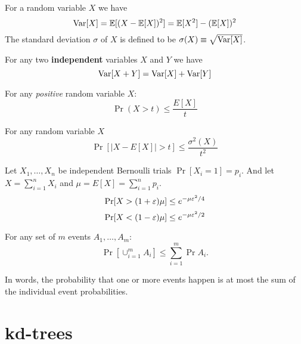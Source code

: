\documentclass{article}
\begin{document}
\begin{definition}[Variance]%
For a random variable $X$ we have 
\begin{equation}
{\operatorname{Var}}[X] = {\mathbb E}[(X - {\mathbb E}[X])^2] = {\mathbb E}[X^2] - ({\mathbb E}[X])^2
\end{equation}
The standard deviation $\sigma$ of $X$ is defined to be $\sigma(X) \equiv \sqrt{{\operatorname{Var}}[X]}$.
\end{definition}

\begin{definition}%
For any two {\bf independent} variables $X$ and $Y$ we have 
\begin{equation}
{\operatorname{Var}}[X + Y] = {\operatorname{Var}}[X] + {\operatorname{Var}}[Y]
\end{equation}
\end{definition}

\begin{fact}%
For any {\it positive} random variable $X$:
\begin{equation}
\Pr(X > t) \le \frac{E[X]}{t}
\end{equation}
\end{fact}

\begin{fact}%
For any random variable $X$
\begin{equation}
\Pr[|X-E[X]| > t] \le \frac{\sigma^2(X)}{t^2}
\end{equation}
\end{fact}


\begin{lemma}
Let $X_1,\ldots,X_n$ be independent Bernoulli trials $\Pr[X_i=1] = p_i$. 
And let $X = \sum_{i=1}^{n}X_i$ and $\mu = E[X] = \sum_{i=1}^{n}p_i$.
\begin{equation}
\Pr[X > (1 + \varepsilon)\mu] \le e^{-\mu \varepsilon^2/4}
\end{equation} 
\begin{equation}
\Pr[X < (1 - \varepsilon)\mu] \le e^{-\mu \varepsilon^2/2}
\end{equation} 
\end{lemma}


\begin{lemma}
For any set of $m$ events $A_1,\ldots,A_m$:
\[
\Pr[\cup_{i=1}^{m}A_i] \le \sum_{i=1}^{m}\Pr{A_i}.
\]
\end{lemma}
In words, the probability that one or more events happen is at most the sum of the 
individual event probabilities. 

\section{kd-trees}
\end{document}
